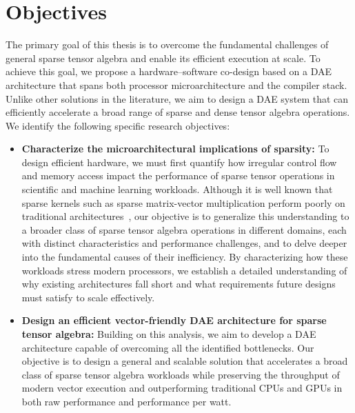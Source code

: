 \section{Objectives} \label{sec:introduction-objectives}

The primary goal of this thesis is to overcome the fundamental challenges of general sparse tensor algebra and enable its efficient execution at scale. To achieve this goal, we propose a hardware--software co-design based on a DAE architecture that spans both processor microarchitecture and the compiler stack. Unlike other solutions in the literature, we aim to design a DAE system that can efficiently accelerate a broad range of sparse and dense tensor algebra operations. We identify the following specific research objectives:

\begin{itemize}
    \item \textbf{Characterize the microarchitectural implications of sparsity:} To design efficient hardware, we must first quantify how irregular control flow and memory access impact the performance of sparse tensor operations in scientific and machine learning workloads. Although it is well known that sparse kernels such as sparse matrix-vector multiplication perform poorly on traditional architectures~\cite{lin2010design,bell2009implementing,sadi2019micro,fowers2014fccm,alappat2022ccpe,grigoras2015fccm,umuroglu2014energy,williams2007sc,nurvitadhi2015sparse}, our objective is to generalize this understanding to a broader class of sparse tensor algebra operations in different domains, each with distinct characteristics and performance challenges, and to delve deeper into the fundamental causes of their inefficiency. By characterizing how these workloads stress modern processors, we establish a detailed understanding of why existing architectures fall short and what requirements future designs must satisfy to scale effectively.

    \item \textbf{Design an efficient vector-friendly DAE architecture for sparse tensor algebra:} Building on this analysis, we aim to develop a DAE architecture capable of overcoming all the identified bottlenecks. Our objective is to design a general and scalable solution that accelerates a broad class of sparse tensor algebra workloads while preserving the throughput of modern vector execution and outperforming traditional CPUs and GPUs in both raw performance and performance per watt.


\end{itemize}
